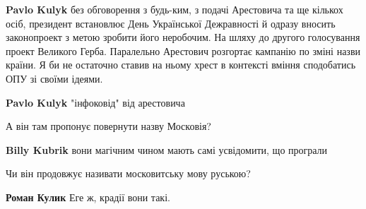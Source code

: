 \begin{itemize}
\begin{itemize}
\textbf{Pavlo Kulyk} без обговорення з будь-ким, з подачі Арестовича та ще кількох осіб, президент встановлює День Української Дежравності й одразу вносить законопроект з метою зробити його неробочим. На шляху до другого голосування проект Великого Герба. Паралельно Арестович розгортає кампанію по зміні назви країни. Я би не остаточно ставив на ньому хрест в контексті вміння сподобатись ОПУ зі своїми ідеями.

 
\textbf{Pavlo Kulyk} "інфоковід" від арестовича
\end{itemize}

 
А він там пропонує повернути назву Московія?

\begin{itemize}
 
\textbf{Billy Kubrik} вони магічним чином мають самі усвідомити, що програли

 
Чи він продовжує називати московитську мову руською?

 
\textbf{Роман Кулик} Еге ж, крадії вони такі.
\end{itemize}

 

\end{itemize}
